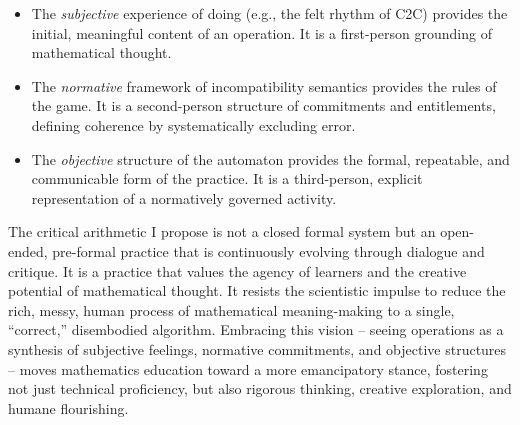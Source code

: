 \documentclass[12pt]{book}
\begin{document}
\begin{itemize}
 \item The \textit{subjective} experience of doing (e.g., the felt rhythm of C2C) provides the initial, meaningful content of an operation. It is a first-person grounding of mathematical thought.
 \item The \textit{normative} framework of incompatibility semantics provides the rules of the game. It is a second-person structure of commitments and entitlements, defining coherence by systematically excluding error.
 \item The \textit{objective} structure of the automaton provides the formal, repeatable, and communicable form of the practice. It is a third-person, explicit representation of a normatively governed activity.
\end{itemize}

The critical arithmetic I propose is not a closed formal system but an open-ended, pre-formal practice that is continuously evolving through dialogue and critique. It is a practice that values the agency of learners and the creative potential of mathematical thought. It resists the scientistic impulse to reduce the rich, messy, human process of mathematical meaning-making to a single, ``correct,'' disembodied algorithm. Embracing this vision  -- seeing operations as a synthesis of subjective feelings, normative commitments, and objective structures  -- moves mathematics education toward a more emancipatory stance, fostering not just technical proficiency, but also rigorous thinking, creative exploration, and humane flourishing.
\end{document}
